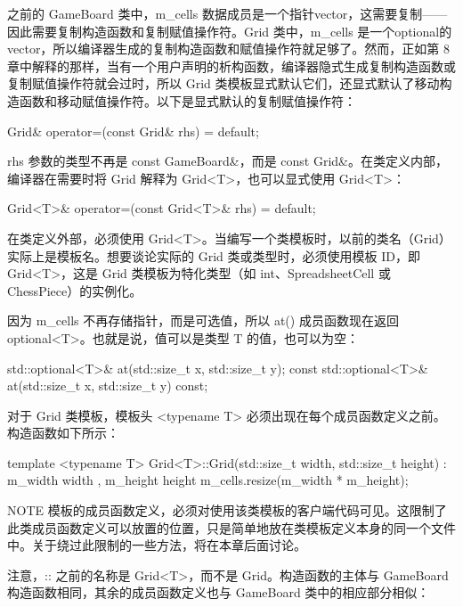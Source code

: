 之前的 GameBoard 类中，m\_cells 数据成员是一个指针vector，这需要复制——因此需要复制构造函数和复制赋值操作符。Grid 类中，m\_cells 是一个optional的vector，所以编译器生成的复制构造函数和赋值操作符就足够了。然而，正如第 8 章中解释的那样，当有一个用户声明的析构函数，编译器隐式生成复制构造函数或复制赋值操作符就会过时，所以 Grid 类模板显式默认它们，还显式默认了移动构造函数和移动赋值操作符。以下是显式默认的复制赋值操作符：

\begin{cpp}
Grid& operator=(const Grid& rhs) = default;
\end{cpp}

rhs 参数的类型不再是 const GameBoard\&，而是 const Grid\&。在类定义内部，编译器在需要时将 Grid 解释为 Grid<T>，也可以显式使用 Grid<T>：

\begin{cpp}
Grid<T>& operator=(const Grid<T>& rhs) = default;
\end{cpp}

在类定义外部，必须使用 Grid<T>。当编写一个类模板时，以前的类名（Grid）实际上是模板名。想要谈论实际的 Grid 类或类型时，必须使用模板 ID，即 Grid<T>，这是 Grid 类模板为特化类型（如 int、SpreadsheetCell 或 ChessPiece）的实例化。

因为 m\_cells 不再存储指针，而是可选值，所以 at() 成员函数现在返回 optional<T>。也就是说，值可以是类型 T 的值，也可以为空：

\begin{cpp}
std::optional<T>& at(std::size_t x, std::size_t y);
const std::optional<T>& at(std::size_t x, std::size_t y) const;
\end{cpp}


对于 Grid 类模板，模板头 <typename T> 必须出现在每个成员函数定义之前。构造函数如下所示：

\begin{cpp}
template <typename T>
Grid<T>::Grid(std::size_t width, std::size_t height)
    : m_width { width }, m_height { height }
{
    m_cells.resize(m_width * m_height);
}
\end{cpp}

\begin{myNotic}{NOTE}
模板的成员函数定义，必须对使用该类模板的客户端代码可见。这限制了此类成员函数定义可以放置的位置，只是简单地放在类模板定义本身的同一个文件中。关于绕过此限制的一些方法，将在本章后面讨论。
\end{myNotic}

注意，:: 之前的名称是 Grid<T>，而不是 Grid。构造函数的主体与 GameBoard 构造函数相同，其余的成员函数定义也与 GameBoard 类中的相应部分相似：

